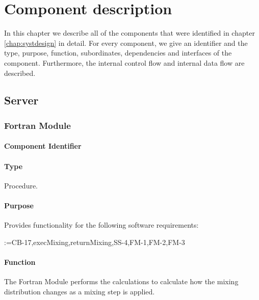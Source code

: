 \makeatletter
\newcommand\addtosrqlist[1]{%
  \def\tempa{}%
  \@for\reserved:=#1\do{%
    \ifx\tempa\empty\else, \fi SRQ\srqref{\reserved}%
    \edef\tempa{something}%
  }
}
\makeatother

\chapter{Component description}
\label{chap:compdescr}
In this chapter we describe all of the components that were identified in chapter \ref{chap:systdesign} in detail. For every component, we give an identifier and the type, purpose, function, subordinates, dependencies and interfaces of the component. Furthermore, the internal control flow and internal data flow are described.

\section{Server}
\subsection{Fortran Module}
\label{subsec:fortranmodule}

\subsubsection*{Component Identifier}
\RTMSFM{}

\subsubsection*{Type}
Procedure.

\subsubsection*{Purpose}
Provides functionality for the following software requirements:

\noindent \addtosrqlist{CB-17,execMixing,returnMixing,SS-4,FM-1,FM-2,FM-3}

\subsubsection*{Function}
The Fortran Module performs the calculations to calculate how the mixing distribution changes as a mixing step is applied.

